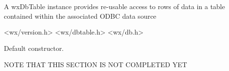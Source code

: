 \section{}\label{wxDbTable}

A wxDbTable instance provides re-usable access to rows of data in
a table contained within the associated ODBC data source


<wx/version.h>
<wx/dbtable.h>
<wx/db.h>






\label{wxDbTableconstr}


Default constructor.


NOTE THAT THIS SECTION IS NOT COMPLETED YET
